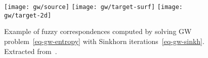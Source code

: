 \begin{figure}[h!]
\centering
\texttt{[image: gw/source]}
\texttt{[image: gw/target-surf]}
\texttt{[image: gw/target-2d]}
\caption{\label{fig-gw-sinkhorn}
Example of fuzzy correspondences computed by solving GW problem~\eqref{eq-gw-entropy} with Sinkhorn iterations~\eqref{eq-gw-sinkh}. Extracted from~\citep{2016-solomon-gw}.
}
\end{figure}




